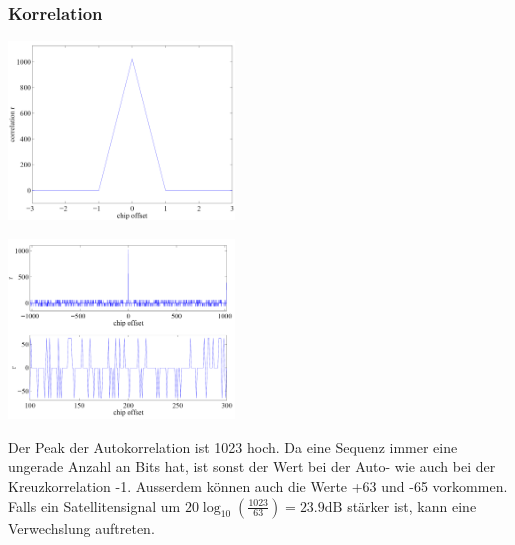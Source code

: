 	\subsubsection{Korrelation}
		\begin{minipage}{6cm}
        	\includegraphics[width=6cm]{./bilder/GPS-Autokorrelation.png}
        \end{minipage}
		\begin{minipage}{6cm}
        	\includegraphics[width=6cm]{./bilder/GPS-Autokorr_Sequenz.png}
        \end{minipage}
		\begin{minipage}{6cm}
        	Der Peak der Autokorrelation ist 1023 hoch. Da eine Sequenz immer eine
        	ungerade Anzahl an Bits hat, ist sonst der Wert bei der
        	Auto- wie auch bei der Kreuzkorrelation -1. Ausserdem können
        	auch die Werte +63 und -65 vorkommen.\\
        	Falls ein Satellitensignal um
        	$20\log_{10}(\frac{1023}{63})=23.9\text{dB}$ stärker ist, kann eine
        	Verwechslung auftreten.
        \end{minipage}

\newpage


